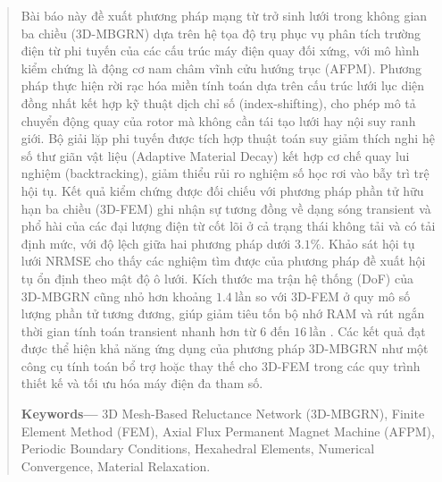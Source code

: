 \begin{abstract}
Bài báo này đề xuất phương pháp mạng từ trở sinh lưới trong không gian ba chiều (3D-MBGRN) dựa trên hệ tọa độ trụ phục vụ phân tích trường điện từ phi tuyến của các cấu trúc máy điện quay đối xứng, với mô hình kiểm chứng là động cơ nam châm vĩnh cửu hướng trục (AFPM). Phương pháp thực hiện rời rạc hóa miền tính toán dựa trên cấu trúc lưới lục diện đồng nhất kết hợp kỹ thuật dịch chỉ số (index-shifting), cho phép mô tả chuyển động quay của rotor mà không cần tái tạo lưới hay nội suy ranh giới. Bộ giải lặp phi tuyến được tích hợp thuật toán suy giảm thích nghi hệ số thư giãn vật liệu (Adaptive Material Decay) kết hợp cơ chế quay lui nghiệm (backtracking), giảm thiểu rủi ro nghiệm số học rơi vào bẫy trì trệ hội tụ. Kết quả kiểm chứng được đối chiếu với phương pháp phần tử hữu hạn ba chiều (3D-FEM) ghi nhận sự tương đồng về dạng sóng transient và phổ hài của các đại lượng điện từ cốt lõi ở cả trạng thái không tải và có tải định mức, với độ lệch giữa hai phương pháp dưới $3.1\%$. Khảo sát hội tụ lưới NRMSE cho thấy các nghiệm tìm được của phương pháp đề xuất hội tụ ổn định theo mật độ ô lưới. Kích thước ma trận hệ thống (DoF) của 3D-MBGRN cũng nhỏ hơn khoảng $1.4~\text{lần}$ so với 3D-FEM ở quy mô số lượng phần tử tương đương, giúp giảm tiêu tốn bộ nhớ RAM và rút ngắn thời gian tính toán transient nhanh hơn từ $6$ đến $16~\text{lần}$ . Các kết quả đạt được thể hiện khả năng ứng dụng của phương pháp 3D-MBGRN như một công cụ tính toán bổ trợ hoặc thay thế cho 3D-FEM trong các quy trình thiết kế và tối ưu hóa máy điện đa tham số.

\textbf{Keywords---} 3D Mesh-Based Reluctance Network (3D-MBGRN), Finite Element Method (FEM), Axial Flux Permanent Magnet Machine (AFPM), Periodic Boundary Conditions, Hexahedral Elements, Numerical Convergence, Material Relaxation.
\end{abstract}   